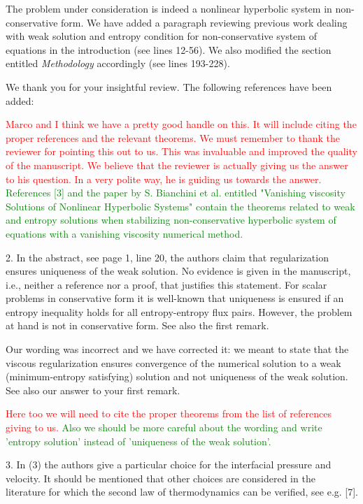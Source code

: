 \documentclass{article}
\newcommand{\tcr}[1]{\textcolor{red}{#1}}
\newcommand{\tcg}[1]{\textcolor{green}{#1}}
\begin{document}
The problem under consideration is indeed a nonlinear hyperbolic system in non-conservative form. 
We have added a paragraph reviewing previous work dealing with weak solution and entropy condition for 
non-conservative system of equations in the introduction (see lines 12-56). We also modified
the section entitled {\it Methodology} accordingly (see lines 193-228).

We thank you for your insightful review. The following references have been added:

\tcr{Marco and I think we have a pretty good handle on this. It will include
citing the proper references and the relevant theorems. We must remember to thank the reviewer
for pointing this out to us. This was invaluable and improved the quality of the manuscript.
We believe that the reviewer is actually giving us the answer to his question. In a very
polite way, he is guiding us towards the answer.}
\tcg{References [3] and the paper by S. Bianchini et al. entitled "Vanishing viscosity Solutions of Nonlinear Hyperbolic Systems" contain the theorems related to weak and entropy solutions when stabilizing non-conservative hyperbolic system of equations with a vanishing viscosity numerical method.}
\bigskip


{\color{blue}
2. In the abstract, see page 1, line 20, the authors claim that regularization ensures
uniqueness of the weak solution. No evidence is given in the manuscript, i.e., neither
a reference nor a proof, that justifies this statement. For scalar problems in 
conservative form it is well-known that uniqueness is ensured if an entropy inequality
holds for all entropy-entropy flux pairs. However, the problem at hand is not in
conservative form. See also the first remark.}

Our wording was incorrect and we have corrected it: we meant to state that the viscous regularization 
ensures convergence of the numerical solution to a weak (minimum-entropy satisfying) solution 
and not uniqueness of the weak solution. See also our answer to your first remark.

\tcr{Here too we will need to cite the proper theorems from the list of references giving to us.} \tcg{Also we should be more careful about the 
wording and write 'entropy solution' instead of 'uniqueness of the weak solution'.}
\bigskip


{\color{blue}
3. In (3) the authors give a particular choice for the interfacial pressure and velocity.
It should be mentioned that other choices are considered in the literature for which
the second law of thermodynamics can be verified, see e.g. [7].}
\end{document}
